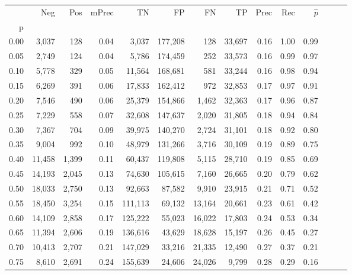 \begin{tabular}{rrrrrrrrrrrrrr}
\toprule
{} &     Neg &    Pos & mPrec &       TN &       FP &      FN &      TP &  Prec &   Rec & $\hat{p}$ \\
p    &         &        &       &          &          &         &         &       &       &           \\
\midrule
0.00 &   3,037 &    128 &  0.04 &    3,037 &  177,208 &     128 &  33,697 &  0.16 &  1.00 &      0.99 \\
0.05 &   2,749 &    124 &  0.04 &    5,786 &  174,459 &     252 &  33,573 &  0.16 &  0.99 &      0.97 \\
0.10 &   5,778 &    329 &  0.05 &   11,564 &  168,681 &     581 &  33,244 &  0.16 &  0.98 &      0.94 \\
0.15 &   6,269 &    391 &  0.06 &   17,833 &  162,412 &     972 &  32,853 &  0.17 &  0.97 &      0.91 \\
0.20 &   7,546 &    490 &  0.06 &   25,379 &  154,866 &   1,462 &  32,363 &  0.17 &  0.96 &      0.87 \\
0.25 &   7,229 &    558 &  0.07 &   32,608 &  147,637 &   2,020 &  31,805 &  0.18 &  0.94 &      0.84 \\
0.30 &   7,367 &    704 &  0.09 &   39,975 &  140,270 &   2,724 &  31,101 &  0.18 &  0.92 &      0.80 \\
0.35 &   9,004 &    992 &  0.10 &   48,979 &  131,266 &   3,716 &  30,109 &  0.19 &  0.89 &      0.75 \\
0.40 &  11,458 &  1,399 &  0.11 &   60,437 &  119,808 &   5,115 &  28,710 &  0.19 &  0.85 &      0.69 \\
0.45 &  14,193 &  2,045 &  0.13 &   74,630 &  105,615 &   7,160 &  26,665 &  0.20 &  0.79 &      0.62 \\
0.50 &  18,033 &  2,750 &  0.13 &   92,663 &   87,582 &   9,910 &  23,915 &  0.21 &  0.71 &      0.52 \\
0.55 &  18,450 &  3,254 &  0.15 &  111,113 &   69,132 &  13,164 &  20,661 &  0.23 &  0.61 &      0.42 \\
0.60 &  14,109 &  2,858 &  0.17 &  125,222 &   55,023 &  16,022 &  17,803 &  0.24 &  0.53 &      0.34 \\
0.65 &  11,394 &  2,606 &  0.19 &  136,616 &   43,629 &  18,628 &  15,197 &  0.26 &  0.45 &      0.27 \\
0.70 &  10,413 &  2,707 &  0.21 &  147,029 &   33,216 &  21,335 &  12,490 &  0.27 &  0.37 &      0.21 \\
0.75 &   8,610 &  2,691 &  0.24 &  155,639 &   24,606 &  24,026 &   9,799 &  0.28 &  0.29 &      0.16 \\

\end{tabular}
